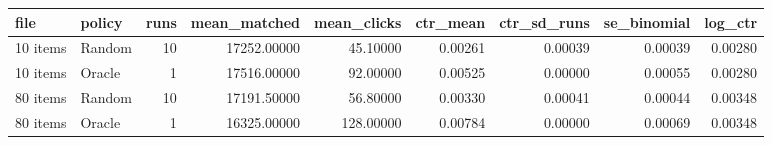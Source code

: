 \begin{tabular}{llrrrrrrr}
\toprule
file & policy & runs & mean\_matched & mean\_clicks & ctr\_mean & ctr\_sd\_runs & se\_binomial & log\_ctr \\
\midrule
10 items & Random & 10 & 17252.00000 & 45.10000 & 0.00261 & 0.00039 & 0.00039 & 0.00280 \\
10 items & Oracle & 1 & 17516.00000 & 92.00000 & 0.00525 & 0.00000 & 0.00055 & 0.00280 \\
80 items & Random & 10 & 17191.50000 & 56.80000 & 0.00330 & 0.00041 & 0.00044 & 0.00348 \\
80 items & Oracle & 1 & 16325.00000 & 128.00000 & 0.00784 & 0.00000 & 0.00069 & 0.00348 \\
\bottomrule
\end{tabular}
